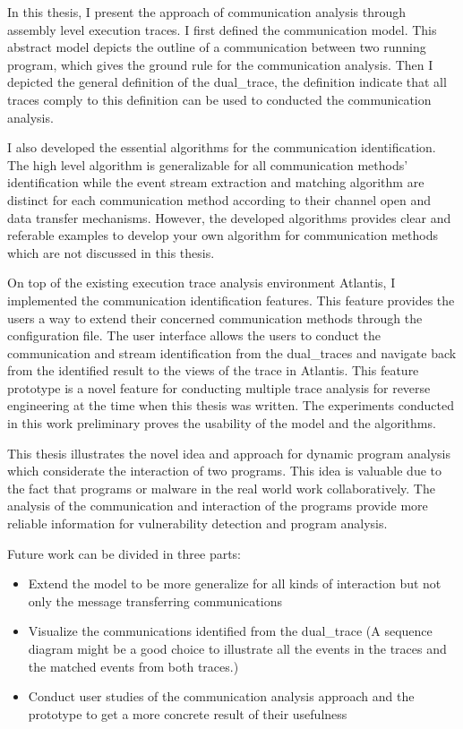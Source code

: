 \label{concl}
In this thesis, I present the approach of communication analysis through assembly level execution traces. I first defined the communication model. This abstract model depicts the outline of a communication between two running program, which gives the ground rule for the communication analysis. Then I depicted the general definition of the dual\_trace, the definition indicate that all traces comply to this definition can be used to conducted the communication analysis.

I also developed the essential algorithms for the communication identification. The high level algorithm is generalizable for all communication methods' identification while  the event stream extraction and matching algorithm are distinct for each communication method according to their channel open and data transfer mechanisms. However, the developed algorithms provides clear and referable examples to develop your own algorithm for communication methods which are not discussed in this thesis.

On top of the existing execution trace analysis environment Atlantis, I implemented the communication identification features. This feature provides the users a way to extend their concerned communication methods through the configuration file. The user interface allows the users to conduct the communication and stream identification from the dual\_traces and navigate back from the identified result to the views of the trace in Atlantis. This feature prototype is a novel feature for conducting multiple trace analysis for reverse engineering at the time when this thesis was written. The experiments conducted in this work preliminary proves the usability of the model and the algorithms. 

This thesis illustrates the novel idea and approach for dynamic program analysis which considerate the interaction of two programs. This idea is valuable due to the fact that programs or malware in the real world work collaboratively. The analysis of the communication and interaction of the programs provide more reliable information for vulnerability detection and program analysis.

Future work can be divided in three parts:
\begin{itemize}
\item Extend the model to be more generalize for all kinds of interaction but not only the message transferring communications
\item Visualize the communications identified from the dual\_trace (A sequence diagram might be a good choice to illustrate all the events in the traces and the matched events from both traces.) 
\item Conduct user studies of the communication analysis approach and the prototype to get a more concrete result of their usefulness
\end{itemize}


